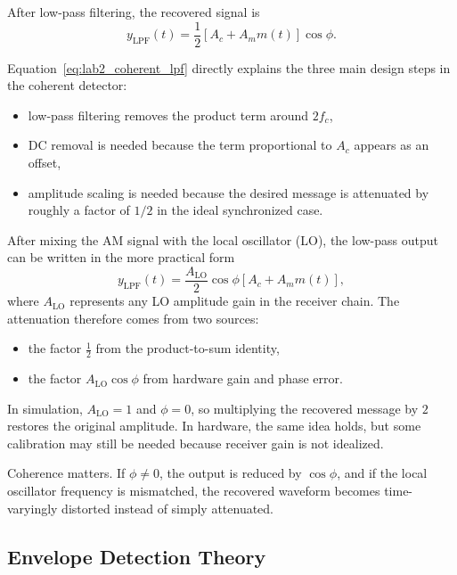 After low-pass filtering, the recovered signal is
\begin{equation}
y_{\mathrm{LPF}}(t)=\frac{1}{2}\left[A_c+A_m m(t)\right]\cos\phi.
\label{eq:lab2_coherent_lpf}
\end{equation}

Equation~\eqref{eq:lab2_coherent_lpf} directly explains the three main design
steps in the coherent detector:
\begin{itemize}
\item low-pass filtering removes the product term around $2f_c$,
\item DC removal is needed because the term proportional to $A_c$ appears as an
offset,
\item amplitude scaling is needed because the desired message is attenuated by
roughly a factor of $1/2$ in the ideal synchronized case.
\end{itemize}

\begin{tcolorbox}[breakable, colback=blue!5!white, colframe=blue!60!black,
title={\textbf{Intuition: Why Amplitude Scaling Is Needed}}]
After mixing the AM signal with the local oscillator (LO), the low-pass output
can be written in the more practical form
\begin{equation}
y_{\mathrm{LPF}}(t)=\frac{A_{\mathrm{LO}}}{2}\cos\phi
\left[A_c + A_m m(t)\right],
\end{equation}
where $A_{\mathrm{LO}}$ represents any LO amplitude gain in the receiver chain.
The attenuation therefore comes from two sources:
\begin{itemize}
\item the factor $\tfrac{1}{2}$ from the product-to-sum identity,
\item the factor $A_{\mathrm{LO}}\cos\phi$ from hardware gain and phase error.
\end{itemize}
In simulation, $A_{\mathrm{LO}}=1$ and $\phi=0$, so multiplying the recovered
message by $2$ restores the original amplitude. In hardware, the same idea
holds, but some calibration may still be needed because receiver gain is not
idealized.
\end{tcolorbox}

Coherence matters. If $\phi \neq 0$, the output is reduced by $\cos\phi$, and
if the local oscillator frequency is mismatched, the recovered waveform becomes
time-varyingly distorted instead of simply attenuated.

\subsection{Envelope Detection Theory}

